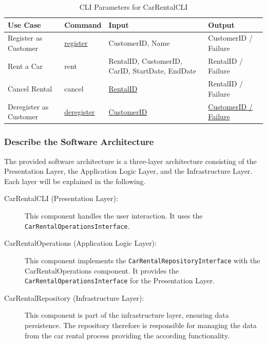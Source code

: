 \begin{table}[h]
      \centering
      \begin{tabular}{|p{4cm}|p{2cm}|p{4cm}|p{5cm}|}
            \hline
            \textbf{Use Case} & \textbf{Command} & \textbf{Input} & \textbf{Output} \\
            \hline
            \hline
            Register as Customer & \underline{register} & CustomerID, Name & CustomerID / Failure \\
            \hline
            Rent a Car & rent & RentalID, CustomerID, CarID, StartDate, EndDate & RentalID / Failure \\
            \hline
            Cancel Rental & cancel & \underline{RentalID} & RentalID / Failure \\
            \hline
            Deregister as Customer & \underline{deregister} & \underline{CustomerID} & \underline{CustomerID / Failure} \\
            \hline
      \end{tabular}
      \caption{CLI Parameters for CarRentalCLI}
      \label{tab:cli_parameters_car_rental_cli}
\end{table}

\subsubsection*{Describe the Software Architecture}
The provided software architecture is a three-layer architecture consisting of the Presentation Layer, the Application Logic Layer, and the Infrastructure Layer.
Each layer will be explained in the following.

\begin{description}
      \item[CarRentalCLI (Presentation Layer):] 
                  This component handles the user interaction.
                  It uses the \texttt{CarRentalOperationsInterface}.
      \item[CarRentalOperations (Application Logic Layer):]
                  This component implements the \texttt{CarRentalRepositoryInterface} with the CarRentalOperations component.
                  It provides the \texttt{CarRentalOperationsInterface} for the Presentation Layer.
      \item[CarRentalRepository (Infrastructure Layer):]
                  This component is part of the infrastructure layer, ensuring data persistence.
                  The repository therefore is responsible for managing the data from the car rental process providing the according functionality.
\end{description}

